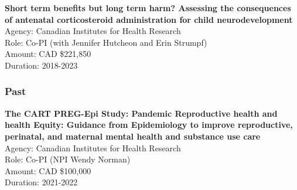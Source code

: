 \documentclass[
  letterpaper,
  DIV=11,
  numbers=noendperiod]{scrartcl}
\begin{document}
\textbf{Short term benefits but long term harm? Assessing the
consequences of antenatal corticosteroid administration for child
neurodevelopment}\\
\hspace*{0.333em}\hspace*{0.333em}\hspace*{0.333em}Agency: Canadian
Institutes for Health Research\\
\hspace*{0.333em}\hspace*{0.333em}\hspace*{0.333em}Role: Co-PI (with
Jennifer Hutcheon and Erin Strumpf)\\
\hspace*{0.333em}\hspace*{0.333em}\hspace*{0.333em}Amount: CAD
\$221,850\\
\hspace*{0.333em}\hspace*{0.333em}\hspace*{0.333em}Duration: 2018-2023\\

\hypertarget{past-1}{%
\subsubsection{Past}\label{past-1}}

\textbf{The CART PREG-Epi Study: Pandemic Reproductive health and health
Equity: Guidance from Epidemiology to improve reproductive, perinatal,
and maternal mental health and substance use care}\\
\hspace*{0.333em}\hspace*{0.333em}\hspace*{0.333em}\hspace*{0.333em}Agency:
Canadian Institutes for Health Research\\
\hspace*{0.333em}\hspace*{0.333em}\hspace*{0.333em}\hspace*{0.333em}Role:
Co-PI (NPI Wendy Norman)\\
\hspace*{0.333em}\hspace*{0.333em}\hspace*{0.333em}\hspace*{0.333em}Amount:
CAD \$100,000\\
\hspace*{0.333em}\hspace*{0.333em}\hspace*{0.333em}\hspace*{0.333em}Duration:
2021-2022\\
\end{document}
